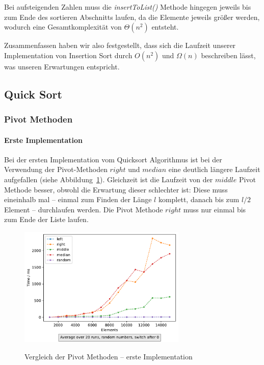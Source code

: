 Bei aufsteigenden Zahlen muss die \textit{insertToList()} Methode hingegen
jeweils bis zum Ende des sortieren Abschnitts laufen, da die Elemente jeweils
größer werden, wodurch eine Gesamtkomplexität von \(\Theta (n^2)\) entsteht.

Zusammenfassen haben wir also festgestellt, dass sich die Laufzeit unserer
Implementation von Insertion Sort durch \(O(n^2)\) und \(\Omega(n)\)
beschreiben lässt, was unseren Erwartungen entspricht.
\subsection{Quick Sort}\label{subsec:quick-sort-laufzeit}

\subsubsection{Pivot Methoden}

\paragraph{Erste Implementation}
Bei der ersten Implementation vom Quicksort Algorithmus ist bei der
Verwendung der Pivot-Methoden \(right\) und \(median\)  eine deutlich längere
Laufzeit aufgefallen (siehe Abbildung~\ref{fig:qsort-first-impl}).
Gleichzeit ist die Laufzeit von der \(middle\) Pivot Methode besser, obwohl
die Erwartung dieser schlechter ist:
Diese muss eineinhalb mal -- einmal zum Finden der Länge \(l\) komplett, danach
bis zum \(l/2\) Element -- durchlaufen werden.
Die Pivot Methode \(right\) muss nur einmal bis zum Ende der Liste laufen.

\begin{figure}[hbt]
    \caption{Vergleich der Pivot Methoden -- erste Implementation}
    \centering
    \includegraphics[width = 8cm]
    {../out/pivotMethods_Implementation1.pdf}\label{fig:qsort-first-impl}
\end{figure}

